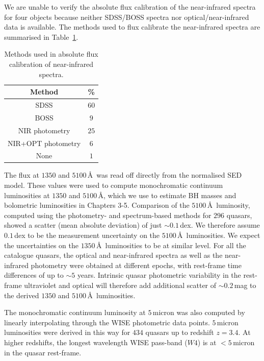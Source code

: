 We are unable to verify the absolute flux calibration of the near-infrared spectra for four objects because neither SDSS/BOSS spectra nor optical/near-infrared data is available. 
The methods used to flux calibrate the near-infrared spectra are summarised in Table~\ref{tab:flux_calibration}. 

\begin{table}
  \centering
  \footnotesize 
  \caption{Methods used in absolute flux calibration of near-infrared spectra.}
  \label{tab:flux_calibration}
    \begin{tabular}{cc} 
    \hline
    Method & \% \\
    \hline
    SDSS               & $60$ \\
    BOSS               & $9$ \\
    NIR photometry     & $25$ \\
    NIR+OPT photometry & $6$ \\
    None               & $1$ \\    
    \hline
    \end{tabular}
\end{table} 

The flux at $1350$ and $5100$\,\AA\, was read off directly from the normalised SED model.
These values were used to compute monochromatic continuum luminosities at $1350$ and $5100$\,\AA, which we use to estimate BH masses and bolometric luminosities in Chapters 3-5. 
Comparison of the $5100$\,\AA\, luminosity, computed using the photometry- and spectrum-based methods for $296$ quasars, showed a scatter (mean absolute deviation) of just $\sim0.1$\,dex.
We therefore assume $0.1$\,dex to be the measurement uncertainty on the $5100$\,\AA\, luminosities.
We expect the uncertainties on the $1350$\,\AA\, luminosities to be at similar level.  
For all the catalogue quasars, the optical and near-infrared spectra as well as the near-infrared photometry were obtained at different epochs, with rest-frame time differences of up to $\sim5$ years. 
Intrinsic quasar photometric variability in the rest-frame ultraviolet and optical will therefore add additional scatter of $\sim0.2$\,mag \citep[e.g.][]{macleod10} to the derived $1350$ and $5100$\,\AA\, luminosities.

The monochromatic continuum luminosity at $5$\,micron was also computed by linearly interpolating through the WISE photometric data points. 
$5$\,micron luminosities were derived in this way for $434$ quasars up to redshift $z=3.4$. 
At higher redshifts, the longest wavelength WISE pass-band ($W4$) is at $<5$\,micron in the quasar rest-frame.

